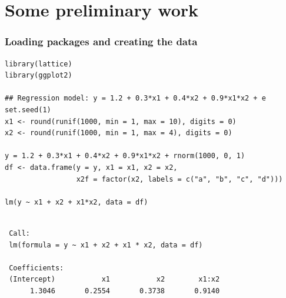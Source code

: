 \documentclass[bigger]{beamer}
\begin{document}
\section{Some preliminary work}
\label{sec-1}
\begin{frame}[fragile,shrink = 10]
\frametitle{Loading packages and creating the data}
\label{sec-1_1}

\lstset{language=R}
\begin{lstlisting}
library(lattice)
library(ggplot2)

## Regression model: y = 1.2 + 0.3*x1 + 0.4*x2 + 0.9*x1*x2 + e
set.seed(1)
x1 <- round(runif(1000, min = 1, max = 10), digits = 0)
x2 <- round(runif(1000, min = 1, max = 4), digits = 0)

y = 1.2 + 0.3*x1 + 0.4*x2 + 0.9*x1*x2 + rnorm(1000, 0, 1)
df <- data.frame(y = y, x1 = x1, x2 = x2, 
                 x2f = factor(x2, labels = c("a", "b", "c", "d")))

lm(y ~ x1 + x2 + x1*x2, data = df)
\end{lstlisting}



\begin{verbatim}
  
 Call:
 lm(formula = y ~ x1 + x2 + x1 * x2, data = df)
 
 Coefficients:
 (Intercept)           x1           x2        x1:x2  
      1.3046       0.2554       0.3738       0.9140
\end{verbatim}
\end{frame}
\end{document}
